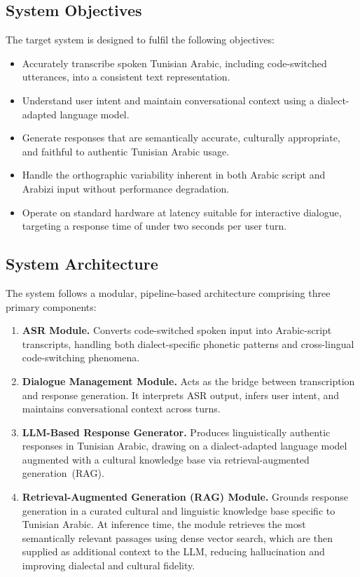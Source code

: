 \documentclass[12pt,a4paper]{report}
\begin{document}
\subsection{System Objectives}

The target system is designed to fulfil the following objectives:

\begin{itemize}
    \item Accurately transcribe spoken Tunisian Arabic, including code-switched utterances,
          into a consistent text representation.
    \item Understand user intent and maintain conversational context using a
          dialect-adapted language model.
    \item Generate responses that are semantically accurate, culturally appropriate, and
          faithful to authentic Tunisian Arabic usage.
    \item Handle the orthographic variability inherent in both Arabic script and Arabizi
          input without performance degradation.
    \item Operate on standard hardware at latency suitable for interactive dialogue,
          targeting a response time of under two seconds per user turn.
\end{itemize}

\subsection{System Architecture}

The system follows a modular, pipeline-based architecture comprising three primary
components:

\begin{enumerate}
    \item \textbf{ASR Module.} Converts code-switched spoken input into Arabic-script
          transcripts, handling both dialect-specific phonetic patterns and cross-lingual
          code-switching phenomena.

    \item \textbf{Dialogue Management Module.} Acts as the bridge between transcription
          and response generation. It interprets ASR output, infers user intent, and
          maintains conversational context across turns.

    \item \textbf{LLM-Based Response Generator.} Produces linguistically authentic
          responses in Tunisian Arabic, drawing on a dialect-adapted language model
          augmented with a cultural knowledge base via retrieval-augmented
          generation~(RAG).

    \item \textbf{Retrieval-Augmented Generation (RAG) Module.} Grounds response
          generation in a curated cultural and linguistic knowledge base specific to
          Tunisian Arabic. At inference time, the module retrieves the most semantically
          relevant passages using dense vector search, which are then supplied as
          additional context to the LLM, reducing hallucination and improving dialectal
          and cultural fidelity.
\end{enumerate}
\end{document}
